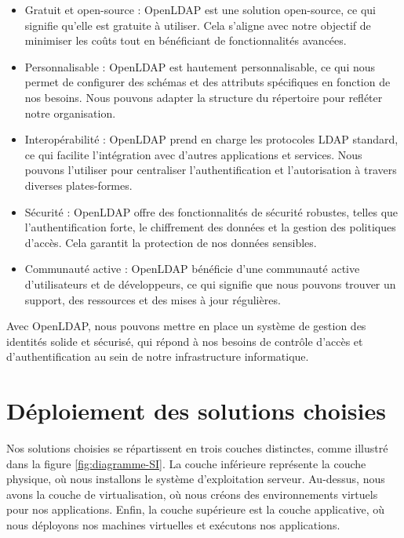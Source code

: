 \begin{itemize}

\item Gratuit et open-source : OpenLDAP est une solution open-source, ce qui signifie qu'elle est gratuite à utiliser. Cela s'aligne avec notre objectif de minimiser les coûts tout en bénéficiant de fonctionnalités avancées.\\

\item Personnalisable : OpenLDAP est hautement personnalisable, ce qui nous permet de configurer des schémas et des attributs spécifiques en fonction de nos besoins. Nous pouvons adapter la structure du répertoire pour refléter notre organisation.\\

\item Interopérabilité : OpenLDAP prend en charge les protocoles LDAP standard, ce qui facilite l'intégration avec d'autres applications et services. Nous pouvons l'utiliser pour centraliser l'authentification et l'autorisation à travers diverses plates-formes.\\

\item Sécurité : OpenLDAP offre des fonctionnalités de sécurité robustes, telles que l'authentification forte, le chiffrement des données et la gestion des politiques d'accès. Cela garantit la protection de nos données sensibles.\\

\item Communauté active : OpenLDAP bénéficie d'une communauté active d'utilisateurs et de développeurs, ce qui signifie que nous pouvons trouver un support, des ressources et des mises à jour régulières.\\

\end{itemize}

Avec OpenLDAP, nous pouvons mettre en place un système de gestion des identités solide et sécurisé, qui répond à nos besoins de contrôle d'accès et d'authentification au sein de notre infrastructure informatique.






\section{Déploiement des solutions choisies}

Nos solutions choisies se répartissent en trois couches distinctes, comme illustré dans la figure \ref{fig:diagramme-SI}. La couche inférieure représente la couche physique, où nous installons le système d'exploitation serveur. Au-dessus, nous avons la couche de virtualisation, où nous créons des environnements virtuels pour nos applications. Enfin, la couche supérieure est la couche applicative, où nous déployons nos machines virtuelles et exécutons nos applications.


